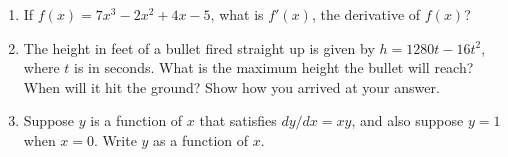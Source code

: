 \documentclass[11pt]{article}
\begin{document}
\begin{enumerate}
\item
If $f(x)=7x^3-2x^2+4x-5$, what is $f'(x)$, the derivative of $f(x)$?

\item
The height in feet of a bullet fired straight up is
given by $h=1280t-16t^2$, where $t$ is in seconds.
What is the maximum height the bullet will reach? 
When will it hit the ground? Show how you arrived at your answer.

\item
Suppose $y$ is a function of $x$ that satisfies
$dy/dx = xy$, and also suppose $y=1$ when $x=0$.
Write $y$ as a function of $x$.

\end{enumerate}
\end{document}
